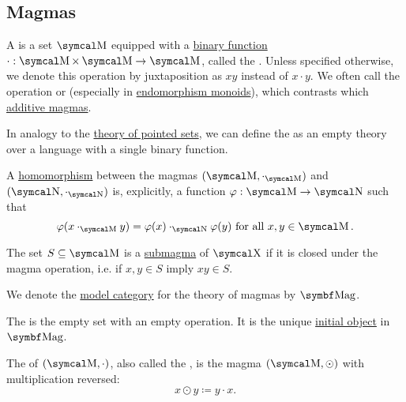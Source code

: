 \subsection{Magmas}\label{subsec:magmas}

\begin{definition}\label{def:magma}
  A  is a set \( \CM \) equipped with a \hyperref[def:function/arity]{binary function} \( \cdot: \CM \times \CM \to \CM \), called the . Unless specified otherwise, we denote this operation by juxtaposition as \( xy \) instead of \( x \cdot y \). We often call the operation  or  (especially in \hyperref[def:endomorphism_monoid]{endomorphism monoids}), which contrasts which \hyperref[rem:additive_magma]{additive magmas}.

  \begin{DefEnum}
     In analogy to the \hyperref[def:pointed_set/theory]{theory of pointed sets}, we can define the  as an empty theory over a language with a single binary function.

     A \hyperref[def:first_order_homomorphism]{homomorphism} between the magmas \( (\CM, \cdot_{\CM}) \) and \( (\CN, \cdot_{\CN}) \) is, explicitly, a function \( \varphi: \CM \to \CN \) such that
    \begin{equation}\label{eq:def:magma/homomorphism}
      \varphi(x \cdot_{\CM} y) = \varphi(x) \cdot_{\CN} \varphi(y) \T{for all} x, y \in \CM.
    \end{equation}

     The set \( S \subseteq \CM \) is a \hyperref[def:first_order_substructure]{submagma} of \( \CX \) if it is closed under the magma operation, i.e. if \( x, y \in S \) imply \( xy \in S \).

     We denote the \hyperref[def:first_order_model_category]{model category} for the theory of magmas by \( \Cat{Mag} \).

     The  is the empty set with an empty operation. It is the unique \hyperref[def:zero_objects/initial]{initial object} in \( \Cat{Mag} \).

     The  of \( (\CM, \cdot) \), also called the , is the magma \( (\CM, \odot) \) with multiplication reversed:
    \begin{equation*}
      x \odot y \coloneqq y \cdot x.
    \end{equation*}


\end{DefEnum}
\end{definition}
